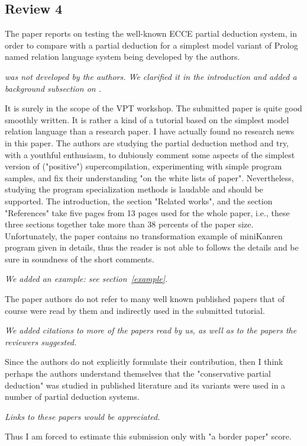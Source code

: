 
\subsection*{Review 4}

The paper reports on testing the well-known ECCE partial deduction system, in order to compare with a partial deduction for a simplest model variant of Prolog named relation language system being developed by the authors.

\emph{\mk was not developed by the authors. We clarified it in the introduction and added a background subsection on \mk. }

It is surely in the scope of the VPT workshop.
The submitted paper is quite good smoothly written.
It is rather a kind of a tutorial based on the simplest model relation language than a research paper.
I have actually found no research news in this paper.
The authors are studying the partial deduction method and try, with a youthful enthusiasm, to dubiously comment some aspects of the simplest version of ("positive") supercompilation, experimenting with simple program samples, and fix their understanding "on the white lists of paper".
Nevertheless, studying the program specialization methods is laudable and should be supported.
The introduction, the section "Related works", and the section "References" take five pages from 13 pages used for the whole paper, i.e., these three sections together take more than 38 percents of the paper size.
Unfortunately, the paper contains no transformation example of miniKanren program given in details, thus the reader is not able to follows the details and be sure in soundness of the short comments.

\emph{We added an example: see section~\ref{example}.}

The paper authors do not refer to many well known published papers that of course were read by them and indirectly used in the submitted tutorial.

\emph{We added citations to more of the papers read by us, as well as to the papers the reviewers suggested.}

Since the authors do not explicitly formulate their contribution, then I think perhaps the authors understand themselves that the "conservative partial deduction" was studied in published literature and its variants were used in a number of partial deduction systems.

\emph{Links to these papers would be appreciated.}

Thus I am forced to estimate this submission only with "a border paper" score.


